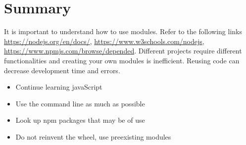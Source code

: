\documentclass[12pt]{article}
\begin{document}
\section*{Summary}
It is important to understand how to use modules. Refer to the following links \href{https://nodejs.org/en/docs/}{https://nodejs.org/en/docs/}, \href{https://www.w3schools.com/nodejs}{https://www.w3schools.com/nodejs}, \href{https://www.npmjs.com/browse/depended}{https://www.npmjs.com/browse/depended}. Different projects require different functionalities and creating your own modules is inefficient. Reusing code can decrease development time and errors. 
\begin{itemize}
    \item Continue learning javaScript
    \item Use the command line as much as possible
    \item Look up npm packages that may be of use
    \item Do not reinvent the wheel, use preexisting modules
\end{itemize}
\end{document}
